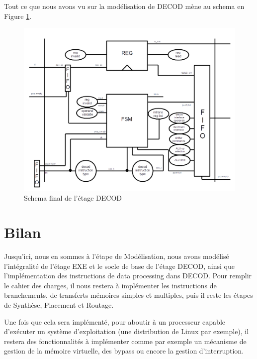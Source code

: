 \documentclass{article}
\begin{document}
Tout ce que nous avons vu sur la modélisation de DECOD mène au schema en Figure \ref{dec}.

\begin{figure}[H]
\includegraphics[width=\textwidth]{pics/dec.png}
\centering
\caption{Schema final de l'étage DECOD} 
\label{dec}
\end{figure}

\section{Bilan}

Jusqu'ici, nous en sommes à l'étape de Modélisation, nous avons modélisé l'intégralité de l'étage EXE
et le socle de base de l'étage DECOD, ainsi que l'implémentation des instructions de data processing dans DECOD.
Pour remplir le cahier des charges, il nous restera à implémenter les instructions de branchements, de
transferts mémoires simples et multiples, puis il reste les étapes de Synthèse, Placement et Routage.

Une fois que cela sera implémenté, pour aboutir à un processeur capable d'exécuter un système d'exploitation
(une distribution de Linux par exemple), il restera des fonctionnalités à implémenter comme par exemple
un mécanisme de gestion de la mémoire virtuelle, des bypass ou encore la gestion d'interruption.

\end{document}
